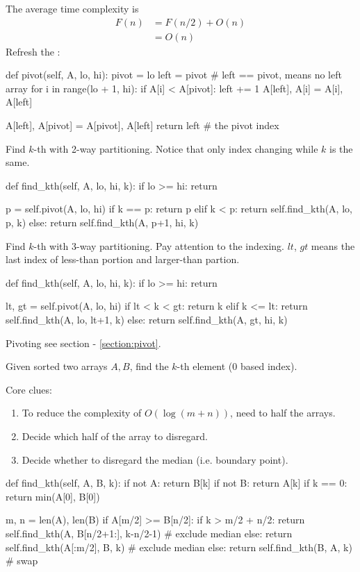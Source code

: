 The average time complexity is
\begin{align*}
F(n) &= F(n/2) + O(n) \\
&= O(n)
\end{align*}
Refresh the :
\begin{python}
def pivot(self, A, lo, hi):
    pivot = lo
    left = pivot  # left == pivot, means no left array
    for i in range(lo + 1, hi):
        if A[i] < A[pivot]:
            left += 1
            A[left], A[i] = A[i], A[left]

    A[left], A[pivot] = A[pivot], A[left]
    return left  # the pivot index
\end{python}
Find $k$-th with 2-way partitioning. Notice that only index changing while $k$ is the same.
\begin{python}
def find_kth(self, A, lo, hi, k):
    if lo >= hi:
      return
    
    p = self.pivot(A, lo, hi)
    if k == p:
      return p
    elif k < p:
      return self.find_kth(A, lo, p, k)
    else:
      return self.find_kth(A, p+1, hi, k)
\end{python}
Find $k$-th with 3-way partitioning. Pay attention to the indexing. $lt$, $gt$ means the last index of less-than portion and larger-than partion. 
\begin{python}
def find_kth(self, A, lo, hi, k):
    if lo >= hi:
      return

    lt, gt = self.pivot(A, lo, hi)
    if lt < k < gt:
      return k
    elif k <= lt:
      return self.find_kth(A, lo, lt+1, k)
    else:
      return self.find_kth(A, gt, hi, k)
\end{python}

Pivoting see section - \ref{section:pivot}.

 Given sorted two arrays $A, B$, find the $k$-th element (0 based index).

Core clues:
\begin{enumerate}
\item To reduce the complexity of $O(\log (m+n))$, need to half the arrays.
\item Decide which half of the array to disregard. 
\item Decide whether to disregard the median (i.e. boundary point).
\end{enumerate}
\begin{python}
def find_kth(self, A, B, k):
  if not A:  return B[k]
  if not B:  return A[k]
  if k == 0: return min(A[0], B[0])

  m, n = len(A), len(B)
  if A[m/2] >= B[n/2]:
    if k > m/2 + n/2:
      return self.find_kth(A, B[n/2+1:], k-n/2-1)  # exclude median
    else:
      return self.find_kth(A[:m/2], B, k)  # exclude median
  else:
    return self.find_kth(B, A, k)  # swap
\end{python}

